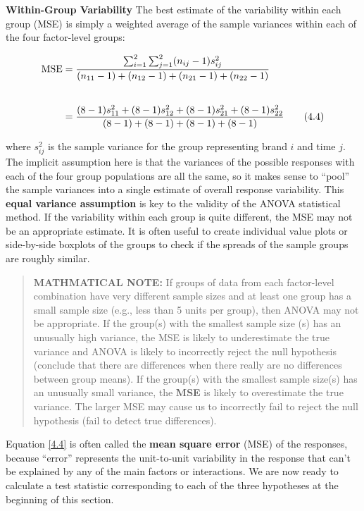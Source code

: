 \documentclass[
]{book}
\begin{document}
\textbf{Within-Group Variability} The best estimate of the variability within each group (MSE) is simply a weighted average of the sample variances within each of the four factor-level groups:

\begin{align}
\text{MSE} &= 
\frac{\sum_{i=1}^{2}\sum_{j=1}^{2}(n_{ij} - 1)s_{ij}^2}{(n_{11} - 1) + (n_{12} - 1) + (n_{21} - 1) + (n_{22} - 1)} \notag \\[2em]
&= \frac{(8 - 1)s_{11}^2 + (8 - 1)s_{12}^2 + (8 - 1)s_{21}^2 + (8 - 1)s_{22}^2}
{(8 - 1) + (8 - 1) + (8 - 1) + (8 - 1)}
\tag{4.4}\label{4.4}
\end{align}

where \(s_{ij}^2\) is the sample variance for the group representing brand \(i\) and time \(j\). The implicit assumption here is that the variances of the possible responses with each of the four group populations are all the same, so it makes sense to ``pool'' the sample variances into a single estimate of overall response variability. This \textbf{equal variance assumption} is key to the validity of the ANOVA statistical method. If the variability within each group is quite different, the MSE may not be an appropriate estimate. It is often useful to create individual value plots or side-by-side boxplots of the groups to check if the spreads of the sample groups are roughly similar.

\begin{quote}
\textbf{MATHMATICAL NOTE:} If groups of data from each factor-level combination have very different sample sizes and at least one group has a small sample size (e.g., less than 5 units per group), then ANOVA may not be appropriate. If the group(s) with the smallest sample size (s) has an unusually high variance, the MSE is likely to underestimate the true variance and ANOVA is likely to incorrectly reject the null hypothesis (conclude that there are differences when there really are no differences between group means). If the group(s) with the smallest sample size(s) has an unusually small variance, the \textbf{MSE} is likely to overestimate the true variance. The larger MSE may cause us to incorrectly fail to reject the null hypothesis (fail to detect true differences).
\end{quote}

Equation \ref{4.4} is often called the \textbf{mean square error} (MSE) of the responses, because ``error'' represents the unit-to-unit variability in the response that can't be explained by any of the main factors or interactions. We are now ready to calculate a test statistic corresponding to each of the three hypotheses at the beginning of this section.
\end{document}
